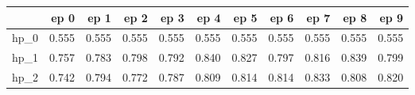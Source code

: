 \begin{tabular}{lrrrrrrrrrr}
\toprule
{} &   ep 0 &   ep 1 &   ep 2 &   ep 3 &   ep 4 &   ep 5 &   ep 6 &   ep 7 &   ep 8 &   ep 9 \\
\midrule
hp\_0 &  0.555 &  0.555 &  0.555 &  0.555 &  0.555 &  0.555 &  0.555 &  0.555 &  0.555 &  0.555 \\
hp\_1 &  0.757 &  0.783 &  0.798 &  0.792 &  0.840 &  0.827 &  0.797 &  0.816 &  0.839 &  0.799 \\
hp\_2 &  0.742 &  0.794 &  0.772 &  0.787 &  0.809 &  0.814 &  0.814 &  0.833 &  0.808 &  0.820 \\
\bottomrule
\end{tabular}
